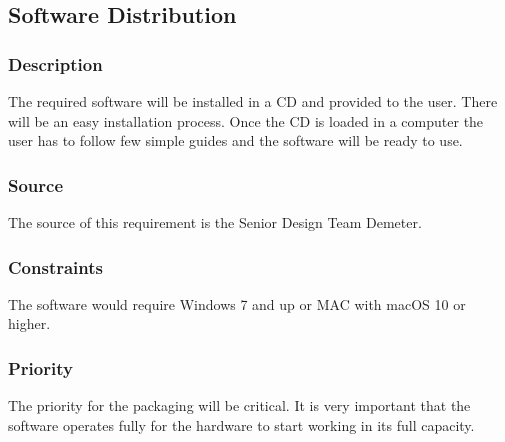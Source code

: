 \subsection{Software Distribution}
\subsubsection{Description}
The required software will be installed in a CD and provided to the user. There will be an easy installation process. Once the CD is loaded in a computer the user has to follow few simple guides and the software will be ready to use.
\subsubsection{Source}
The source of this requirement is the Senior Design Team Demeter.
\subsubsection{Constraints}
The software would require Windows 7 and up or MAC with macOS 10 or higher.
\subsubsection{Priority}
The priority for the packaging will be critical. It is very important that the software operates fully for the hardware to start working in its full capacity.
